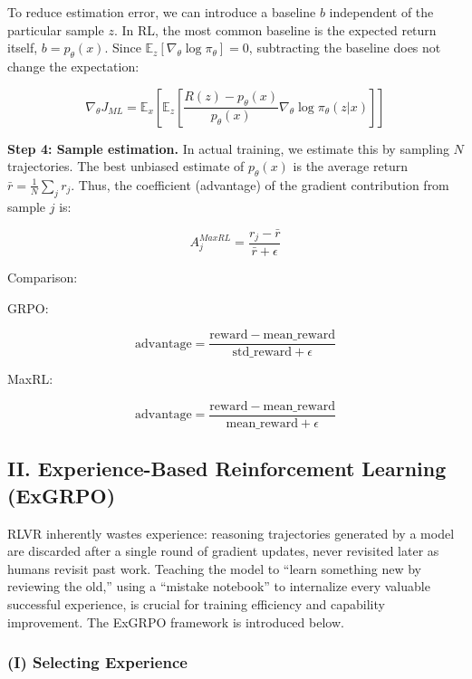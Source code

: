 To reduce estimation error, we can introduce a baseline \(b\) independent of the particular sample \(z\). In RL, the most common baseline is the expected return itself, \(b=p_\theta(x)\). Since \(\mathbb{E}_z[\nabla_\theta\log\pi_\theta]=0\), subtracting the baseline does not change the expectation:

\[
\nabla_\theta J_{ML}=\mathbb{E}_x\left[\mathbb{E}_z\left[\frac{R(z)-p_\theta(x)}{p_\theta(x)}\nabla_\theta\log\pi_\theta(z|x)\right]\right]
\]

\textbf{Step 4: Sample estimation.} In actual training, we estimate this by sampling \(N\) trajectories. The best unbiased estimate of \(p_\theta(x)\) is the average return \(\bar{r}=\frac{1}{N}\sum_j r_j\). Thus, the coefficient (advantage) of the gradient contribution from sample \(j\) is:

\[
A_j^{MaxRL}=\frac{r_j-\bar{r}}{\bar{r}+\epsilon}
\]

Comparison:

GRPO:

\[
\mathrm{advantage}=\frac{\mathrm{reward}-\mathrm{mean\_reward}}{\mathrm{std\_reward}+\epsilon}
\]

MaxRL:

\[
\mathrm{advantage}=\frac{\mathrm{reward}-\mathrm{mean\_reward}}{\mathrm{mean\_reward}+\epsilon}
\]

\hypertarget{ii.-experience-based-reinforcement-learning-exgrpo}{%
\subsection{II. Experience-Based Reinforcement Learning (ExGRPO)}\label{ii.-experience-based-reinforcement-learning-exgrpo}}

RLVR inherently wastes experience: reasoning trajectories generated by a model are discarded after a single round of gradient updates, never revisited later as humans revisit past work. Teaching the model to ``learn something new by reviewing the old,'' using a ``mistake notebook'' to internalize every valuable successful experience, is crucial for training efficiency and capability improvement. The ExGRPO framework is introduced below.

\hypertarget{i-selecting-experience}{%
\subsubsection{(I) Selecting Experience}\label{i-selecting-experience}}

